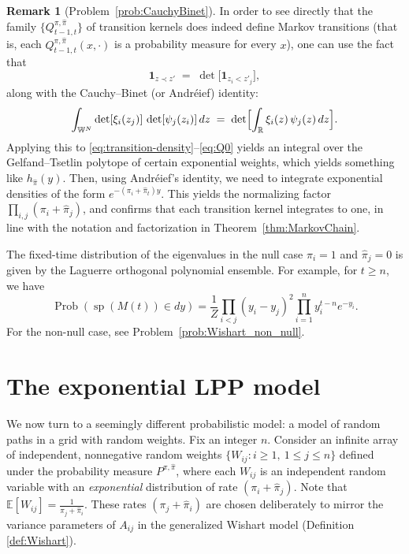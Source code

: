 \documentclass[letterpaper,11pt,oneside,reqno]{article}
\numberwithin{equation}{section}
\theoremstyle{definition}
\newtheorem{remark}[proposition]{Remark}
\begin{document}
\begin{remark}[Problem~\ref{prob:CauchyBinet}]
\label{rem:CauchyBinet}
In order to see directly that the family $\bigl\{Q^{\pi,\hat{\pi}}_{t-1,t}\bigr\}$ of transition kernels does indeed define Markov transitions (that is, each $Q^{\pi,\hat{\pi}}_{t-1,t}(x,\cdot)$ is a probability measure for every $x$), one can use the fact that
\[
	\mathbf{1}_{z \prec z'}
\;=\;
\det\bigl[\mathbf{1}_{z_i < z'_j}\bigr],
\]
along with the Cauchy--Binet (or Andr\'eief) identity:
\[
\int_{\mathbb{W}^N}
\det[\xi_i(z_j)]\,
\det[\psi_j(z_i)]
\,dz
\;=\;
\det\Bigl[
\int_{\mathbb{R}}
\xi_i(z)\,\psi_j(z)\,dz
\Bigr].
\]
Applying this to
\eqref{eq:transition-density}--\eqref{eq:Q0}
yields an integral over the Gelfand--Tsetlin polytope
of certain exponential weights, which yields something like $h_{\hat \pi}(y)$.
Then, using Andr\'eief's identity, we need to integrate
exponential densities of the form $e^{-(\pi_i+\hat \pi_t)y}$.
This yields the normalizing factor
$\prod_{i,j}(\pi_i+\hat \pi_j)$,
and confirms
that each transition kernel
integrates to one, in line with the notation and
factorization in Theorem~\ref{thm:MarkovChain}.
\end{remark}

The fixed-time distribution of the eigenvalues
in the null case $\pi_i=1$ and $\hat\pi_j=0$ is
given by the Laguerre orthogonal polynomial ensemble. For example, for $t\ge n$, we have
\begin{equation}
	\label{eq:Laguerre}
	\operatorname{Prob}(\operatorname{sp}(M(t))\in dy)
	=
	\frac{1}{Z}\prod_{i<j}(y_i-y_j)^2
	\prod_{i=1}^n y_i^{t-n} e^{-y_i}.
\end{equation}
For the non-null case, see Problem~\ref{prob:Wishart_non_null}.

\section{The exponential LPP model}

We now turn to a seemingly different probabilistic model: a
model of random paths in a grid with random weights. Fix an
integer $n$. Consider an infinite array of independent,
nonnegative random weights $\{W_{ij}: i\ge 1,\ 1\le j\le n\}$ defined under the probability measure $P^{\pi,\hat\pi}$,
where each $W_{ij}$ is an independent random variable with
an \emph{exponential} distribution of rate $(\pi_i +
\hat\pi_j)$.
Note that $\mathbb{E}[W_{ij}] = \frac{1}{\pi_j+\hat\pi_i}$.
These rates $(\pi_j+\hat\pi_i)$ are chosen deliberately to
mirror the variance parameters of $A_{ij}$ in the
generalized Wishart model (Definition \ref{def:Wishart}).
\end{document}
